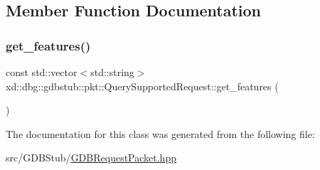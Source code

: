 \subsection{Member Function Documentation}
\mbox{\label{classxd_1_1dbg_1_1gdbstub_1_1pkt_1_1_query_supported_request_acad6e1b74f4e12041f00f5bf810127f8}} 
\subsubsection{\texorpdfstring{get\+\_\+features()}{get\_features()}}
{\footnotesize\ttfamily const std\+::vector$<$std\+::string$>$ xd\+::dbg\+::gdbstub\+::pkt\+::\+Query\+Supported\+Request\+::get\+\_\+features (\begin{DoxyParamCaption}{ }\end{DoxyParamCaption})\hspace{0.3cm}{\ttfamily [inline]}}



The documentation for this class was generated from the following file\+:\begin{DoxyCompactItemize}
\item 
src/\+G\+D\+B\+Stub/\mbox{\hyperlink{_g_d_b_request_packet_8hpp}{G\+D\+B\+Request\+Packet.\+hpp}}\end{DoxyCompactItemize}
